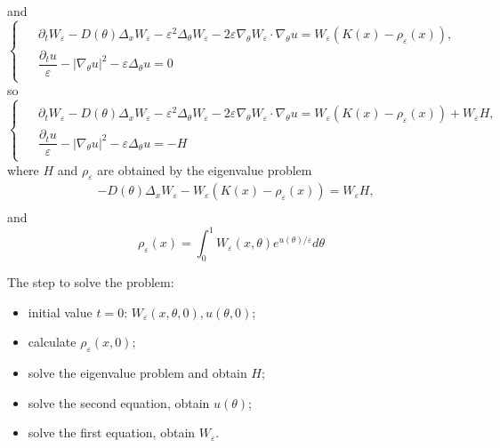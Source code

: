 \documentclass[preprint]{article}
\numberwithin{equation}{section}
\begin{document}
and
\begin{equation}
\begin{cases}
\begin{aligned}
&\partial_t W_\varepsilon-D(\theta)\Delta_x W_\varepsilon -\varepsilon^2\Delta_\theta W_\varepsilon - 2\varepsilon\nabla_\theta W_\varepsilon\cdot \nabla_\theta u = W_\varepsilon (K(x)-\rho_\varepsilon(x)),\\
& \dfrac{\partial_t u}{\varepsilon} - |\nabla_\theta u|^2 - \varepsilon \Delta_\theta u=0
\end{aligned}
\end{cases}
\end{equation}
so
\begin{equation}
\begin{cases}
\begin{aligned}
&\partial_t W_\varepsilon-D(\theta)\Delta_x W_\varepsilon -\varepsilon^2\Delta_\theta W_\varepsilon - 2\varepsilon\nabla_\theta W_\varepsilon\cdot \nabla_\theta u = W_\varepsilon (K(x)-\rho_\varepsilon(x)) + W_\varepsilon H,\\
& \dfrac{\partial_t u}{\varepsilon} - |\nabla_\theta u|^2 - \varepsilon \Delta_\theta u= -H
\end{aligned}
\end{cases}
\end{equation}
where $H$ and $\rho_\varepsilon$ are obtained by the eigenvalue problem
\begin{equation}
\begin{aligned}
&-D(\theta)\Delta_x W_\varepsilon - W_\varepsilon (K(x)-\rho_\varepsilon(x)) = W_\varepsilon H,\\
\end{aligned}
\end{equation}
and
\begin{equation}
\rho_\varepsilon(x) = \int_0^1 W_\varepsilon(x,\theta) e^{u(\theta)/\varepsilon} d\theta
\end{equation}

The step to solve the problem:
\begin{itemize}
\item initial value $t=0$: $W_\varepsilon(x,\theta, 0), u(\theta, 0)$;

\item calculate $\rho_\varepsilon(x, 0)$;

\item solve the eigenvalue problem and obtain $H$;

\item solve the second equation, obtain $u(\theta)$;

\item solve the first equation, obtain $W_\varepsilon$.
\end{itemize}
\end{document}
